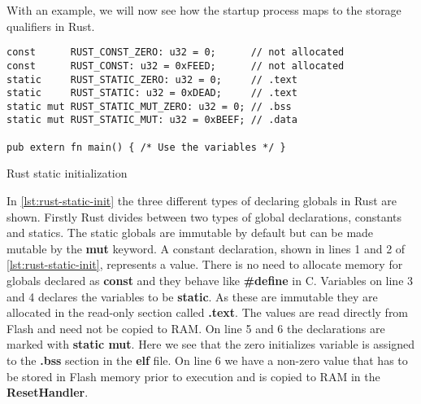 With an example, we will now see how the startup process maps to the storage qualifiers in Rust.
\begin{listing}[H]
\begin{verbatim}
const      RUST_CONST_ZERO: u32 = 0;      // not allocated
const      RUST_CONST: u32 = 0xFEED;      // not allocated
static     RUST_STATIC_ZERO: u32 = 0;     // .text
static     RUST_STATIC: u32 = 0xDEAD;     // .text
static mut RUST_STATIC_MUT_ZERO: u32 = 0; // .bss
static mut RUST_STATIC_MUT: u32 = 0xBEEF; // .data

pub extern fn main() { /* Use the variables */ }
\end{verbatim}
\caption{Rust static initialization}
\label{lst:rust-static-init}
\end{listing}
In \autoref{lst:rust-static-init} the three different types of declaring globals in Rust are shown.
Firstly Rust divides between two types of global declarations, constants and statics.
The static globals are immutable by default but can be made mutable by the \textbf{mut} keyword.
A constant declaration, shown in lines 1 and 2 of \autoref{lst:rust-static-init}, represents a value.
There is no need to allocate memory for globals declared as \textbf{const} and they behave like \textbf{\#define} in C. 
Variables on line 3 and 4 declares the variables to be \textbf{static}.
As these are immutable they are allocated in the read-only section called \textbf{.text}.
The values are read directly from Flash and need not be copied to RAM.
On line 5 and 6 the declarations are marked with \textbf{static mut}.
Here we see that the zero initializes variable is assigned to the \textbf{.bss} section in the \textbf{elf} file.
On line 6 we have a non-zero value that has to be stored in Flash memory prior to execution and is copied to RAM in the \textbf{ResetHandler}.
